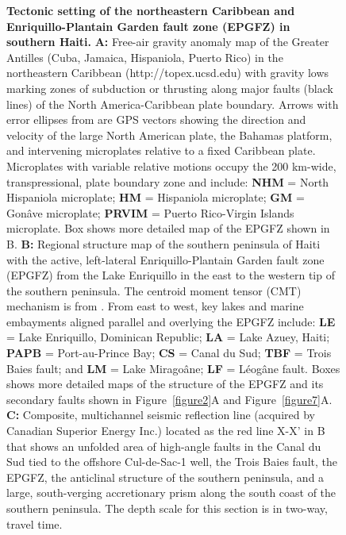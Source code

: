 \documentclass[linenumbers,draft]{agujournal}
\begin{document}
\begin{figure}
\centering
\caption{\textbf{Tectonic setting of the northeastern Caribbean and Enriquillo-Plantain Garden fault zone (EPGFZ) in southern Haiti.} \textbf{A:}
Free-air gravity anomaly map of the Greater Antilles (Cuba, Jamaica, Hispaniola, Puerto Rico) in the northeastern Caribbean (http://topex.ucsd.edu) with gravity lows marking zones of subduction or thrusting along major faults (black lines) of the North America-Caribbean plate boundary. Arrows with error ellipses from \citet{calais2010transpressional} are GPS vectors showing the direction and velocity of the large North American plate, the Bahamas platform, and intervening microplates relative to a fixed Caribbean plate. Microplates with variable relative motions occupy the 200 km-wide, transpressional, plate boundary zone and include: \textbf{NHM} = North Hispaniola microplate; \textbf{HM} = Hispaniola microplate; \textbf{GM} = Gon\^ave microplate; \textbf{PRVIM} = Puerto Rico-Virgin Islands microplate. Box shows more detailed map of the EPGFZ shown in B. \textbf{B:} Regional structure map of the southern peninsula of Haiti with the active, left-lateral Enriquillo-Plantain Garden fault zone (EPGFZ) from the Lake Enriquillo in the east to the western tip of the southern peninsula. The centroid moment tensor (CMT) mechanism is from \citet{douilly2013crustal}. From east to west, key lakes and marine embayments aligned parallel and overlying the EPGFZ include: \textbf{LE} = Lake Enriquillo, Dominican Republic; \textbf{LA} = Lake Azuey, Haiti; \textbf{PAPB} = Port-au-Prince Bay; \textbf{CS }= Canal du Sud; \textbf{TBF }= Trois Baies fault; and \textbf{LM} = Lake Mirago\^ane; \textbf{LF} = L\'eog\^ane fault. Boxes shows more detailed maps of the structure of the EPGFZ and its secondary faults shown in Figure~\ref{figure2}A and Figure~\ref{figure7}A. \textbf{C:} Composite, multichannel seismic reflection line (acquired by Canadian Superior Energy Inc.) located as the red line X-X' in B that shows an unfolded area of high-angle faults in the Canal du Sud tied to the offshore Cul-de-Sac-1 well, the Trois Baies fault, the EPGFZ, the anticlinal structure of the southern peninsula, and a large, south-verging accretionary prism along the south coast of the southern peninsula. The depth scale for this section is in two-way, travel time.}
\label{figure1}
\end{figure}
\end{document}
